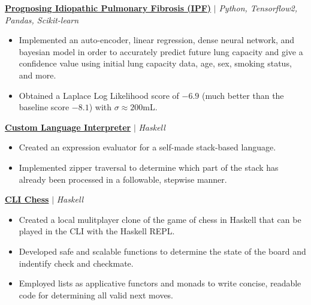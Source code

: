 \documentclass{article}
\newcommand{\smallbullet}{\,\begin{picture}(-1,1)(-1,-3)\circle*{3}\end{picture}\ }
\newenvironment{resumeItem}
{
    \vspace{0.5em}
}
{
}
\newcommand{\projectHead}[3]{
    \textbf{#1} $\vert$ \textit{#2} \\[-1.2em]
}
\newenvironment{resumeList}
{
    \begin{itemize}[label=\smallbullet]
}
{
    \end{itemize}
}
\begin{document}
\begin{resumeItem}
\projectHead{\href{https://github.com/arnavcs/OSIC-IPF}{Prognosing Idiopathic Pulmonary Fibrosis (IPF)}}{Python, Tensorflow2, Pandas, Scikit-learn}{Dec 2020 - Jun 2021}
\begin{resumeList}
    \item Implemented an auto-encoder, linear regression, dense neural network, and bayesian model in order to accurately predict future lung capacity and give a confidence value using initial lung capacity data, age, sex, smoking status, and more.
    \item Obtained a Laplace Log Likelihood score of $-6.9$ (much better than the baseline score $-8.1$) with $\sigma \approx 200$mL.
\end{resumeList}
\end{resumeItem}

\begin{resumeItem}
\projectHead{\href{https://github.com/arnavcs/quack-stack}{Custom Language Interpreter}}{Haskell}{May 2023 - Present}
\begin{resumeList}
    \item Created an expression evaluator for a self-made stack-based language.
    \item Implemented zipper traversal to determine which part of the stack has already been processed in a followable, stepwise manner.
\end{resumeList}
\end{resumeItem}

\begin{resumeItem}
\projectHead{\href{https://github.com/arnavcs/cli-chess}{CLI Chess}}{Haskell}{Aug 2022 - Present}
\begin{resumeList}
    \item Created a local mulitplayer clone of the game of chess in Haskell that can be played in the CLI with the Haskell REPL.
    \item Developed safe and scalable functions to determine the state of the board and indentify check and checkmate.
    \item Employed lists as applicative functors and monads to write concise, readable code for determining all valid next moves.
\end{resumeList}
\end{resumeItem}

\end{document}
